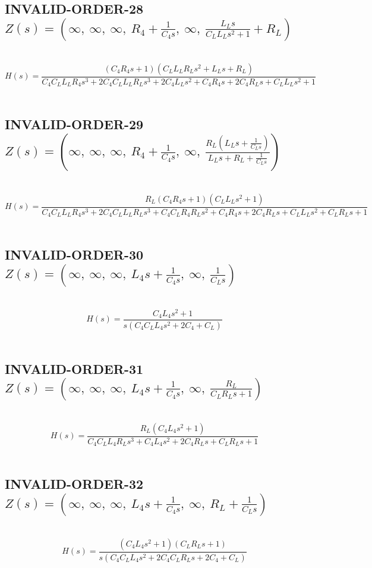 \documentclass{article}
\begin{document}
\subsection{INVALID-ORDER-28 $Z(s) = \left( \infty, \  \infty, \  \infty, \  R_{4} + \frac{1}{C_{4} s}, \  \infty, \  \frac{L_{L} s}{C_{L} L_{L} s^{2} + 1} + R_{L}\right)$ } \ 
\textbf{\[H(s) = \frac{\left(C_{4} R_{4} s + 1\right) \left(C_{L} L_{L} R_{L} s^{2} + L_{L} s + R_{L}\right)}{C_{4} C_{L} L_{L} R_{4} s^{3} + 2 C_{4} C_{L} L_{L} R_{L} s^{3} + 2 C_{4} L_{L} s^{2} + C_{4} R_{4} s + 2 C_{4} R_{L} s + C_{L} L_{L} s^{2} + 1}\] } \ 
\subsection{INVALID-ORDER-29 $Z(s) = \left( \infty, \  \infty, \  \infty, \  R_{4} + \frac{1}{C_{4} s}, \  \infty, \  \frac{R_{L} \left(L_{L} s + \frac{1}{C_{L} s}\right)}{L_{L} s + R_{L} + \frac{1}{C_{L} s}}\right)$ } \ 
\textbf{\[H(s) = \frac{R_{L} \left(C_{4} R_{4} s + 1\right) \left(C_{L} L_{L} s^{2} + 1\right)}{C_{4} C_{L} L_{L} R_{4} s^{3} + 2 C_{4} C_{L} L_{L} R_{L} s^{3} + C_{4} C_{L} R_{4} R_{L} s^{2} + C_{4} R_{4} s + 2 C_{4} R_{L} s + C_{L} L_{L} s^{2} + C_{L} R_{L} s + 1}\] } \ 
\subsection{INVALID-ORDER-30 $Z(s) = \left( \infty, \  \infty, \  \infty, \  L_{4} s + \frac{1}{C_{4} s}, \  \infty, \  \frac{1}{C_{L} s}\right)$ } \ 
\textbf{\[H(s) = \frac{C_{4} L_{4} s^{2} + 1}{s \left(C_{4} C_{L} L_{4} s^{2} + 2 C_{4} + C_{L}\right)}\] } \ 
\subsection{INVALID-ORDER-31 $Z(s) = \left( \infty, \  \infty, \  \infty, \  L_{4} s + \frac{1}{C_{4} s}, \  \infty, \  \frac{R_{L}}{C_{L} R_{L} s + 1}\right)$ } \ 
\textbf{\[H(s) = \frac{R_{L} \left(C_{4} L_{4} s^{2} + 1\right)}{C_{4} C_{L} L_{4} R_{L} s^{3} + C_{4} L_{4} s^{2} + 2 C_{4} R_{L} s + C_{L} R_{L} s + 1}\] } \ 
\subsection{INVALID-ORDER-32 $Z(s) = \left( \infty, \  \infty, \  \infty, \  L_{4} s + \frac{1}{C_{4} s}, \  \infty, \  R_{L} + \frac{1}{C_{L} s}\right)$ } \ 
\textbf{\[H(s) = \frac{\left(C_{4} L_{4} s^{2} + 1\right) \left(C_{L} R_{L} s + 1\right)}{s \left(C_{4} C_{L} L_{4} s^{2} + 2 C_{4} C_{L} R_{L} s + 2 C_{4} + C_{L}\right)}\] } \ 
\end{document}
